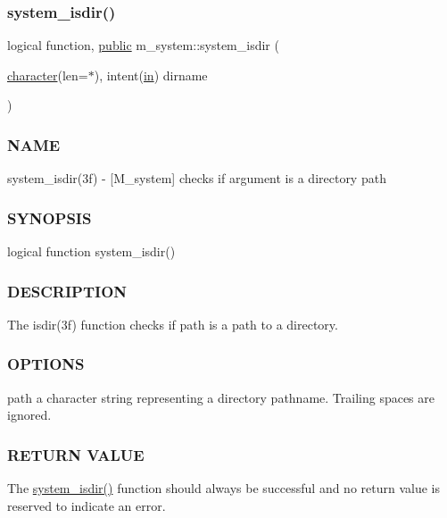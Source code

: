 \subsubsection{\texorpdfstring{system\+\_\+isdir()}{system\_isdir()}}
{\footnotesize\ttfamily logical function, \hyperlink{M__stopwatch_83_8txt_a2f74811300c361e53b430611a7d1769f}{public} m\+\_\+system\+::system\+\_\+isdir (\begin{DoxyParamCaption}\item[{\hyperlink{option__stopwatch_83_8txt_abd4b21fbbd175834027b5224bfe97e66}{character}(len=$\ast$), intent(\hyperlink{M__journal_83_8txt_afce72651d1eed785a2132bee863b2f38}{in})}]{dirname }\end{DoxyParamCaption})}



\subsubsection*{N\+A\+ME}

system\+\_\+isdir(3f) -\/ \mbox{[}M\+\_\+system\mbox{]} checks if argument is a directory path 

\subsubsection*{S\+Y\+N\+O\+P\+S\+IS}

\begin{DoxyVerb}logical function system_isdir()
\end{DoxyVerb}


\subsubsection*{D\+E\+S\+C\+R\+I\+P\+T\+I\+ON}

The isdir(3f) function checks if path is a path to a directory.

\subsubsection*{O\+P\+T\+I\+O\+NS}

path a character string representing a directory pathname. Trailing spaces are ignored.

\subsubsection*{R\+E\+T\+U\+RN V\+A\+L\+UE}

The \hyperlink{namespacem__system_ad097988a031e64b4f21f856cf45c9c73}{system\+\_\+isdir()} function should always be successful and no return value is reserved to indicate an error.

